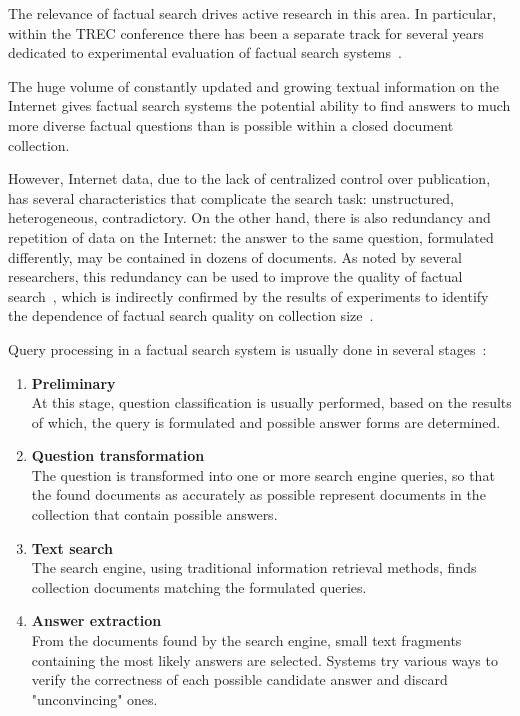 \documentclass{article}
\begin{document}
The relevance of factual search drives active
research in this area. In particular, within the TREC conference
there has been a separate track for several years dedicated to
experimental evaluation of factual search systems~\cite{qa:TREC8:evaluation}.

The huge volume of constantly updated and growing textual
information on the Internet gives factual search systems
the potential ability to find answers to much more diverse
factual questions than is possible within a closed
document collection.

However, Internet data, due to the lack of centralized
control over publication, has several characteristics that complicate the search
task: unstructured, heterogeneous, contradictory.
On the other hand,
there is also redundancy and repetition of data on the Internet:
the answer to the same question, formulated differently, may be contained
in dozens of documents. As noted by several researchers,
this redundancy can be used
to improve the quality of factual
search~\cite{qa:dumais:redundancy,qa:clarke:redundancy},
which is indirectly confirmed by the results of
experiments to identify the dependence of factual search quality
on collection size~\cite{qa:clarke:corpus_size_impact,qa:clarke:web_reinforced}.

Query processing in a factual search system
is usually done in several stages~\cite{qa:Mulder}:
\begin{enumerate}
\item {\bf Preliminary} \\
At this stage, question classification is usually performed,
based on the results of which, the query is formulated and possible answer forms are determined.

\item {\bf Question transformation} \\
The question is transformed into one or more search engine queries,
so that the found documents as accurately as possible represent
documents in the collection that contain possible answers.

\item {\bf Text search} \\
The search engine, using traditional information retrieval methods,
finds collection documents matching the formulated queries.

\item {\bf Answer extraction} \\
From the documents found by the search engine,
small text fragments containing the most likely answers are selected.
Systems try various ways to verify the correctness of each possible
candidate answer and discard "unconvincing" ones.
\end{enumerate}
\end{document}

